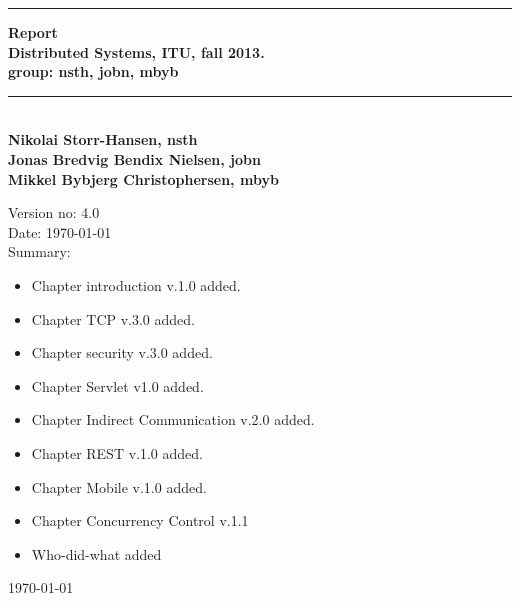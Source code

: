 \begin{titlepage}
\begin{center}
\rule{430pt}{3pt}
 {\huge\bfseries Report\\ }
 {\normalsize\bfseries Distributed Systems, ITU, fall 2013.\\ group: nsth, jobn, mbyb} 
  
 \rule{430pt}{3pt}\\[1cm]
 
 {\normalsize\bfseries Nikolai Storr-Hansen, nsth} \\
 {\normalsize\bfseries Jonas Bredvig Bendix Nielsen, jobn} \\
 {\normalsize\bfseries Mikkel Bybjerg Christophersen, mbyb} \\

 \vspace{2cm}
\end{center}


Version no: 4.0 \\

Date: \today \\

Summary: \\
 
\begin{itemize}

\item Chapter introduction v.1.0 added.

\item Chapter TCP v.3.0 added.

\item Chapter security v.3.0 added.

\item Chapter Servlet v1.0 added. 

\item Chapter Indirect Communication v.2.0 added.

\item Chapter REST v.1.0 added.

\item Chapter Mobile v.1.0 added.

\item Chapter Concurrency Control v.1.1

\item Who-did-what added
\end{itemize}


\begin{center}

 \vfill
\textsl{}
 \vfill
{\today}
\end{center}
\end{titlepage}